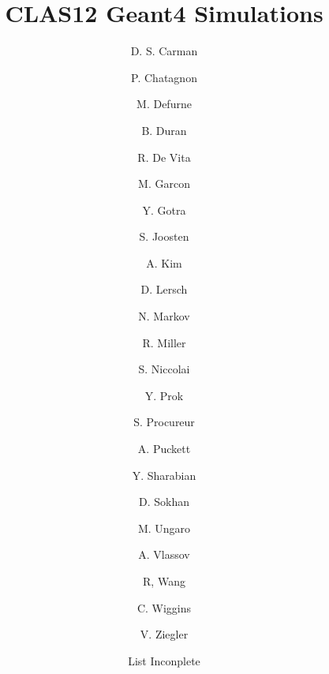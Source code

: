 \title{CLAS12 Geant4 Simulations}




\author[A]{D. S. Carman}
\author[E]{P. Chatagnon}
\author[C]{M. Defurne}
\author[K]{B. Duran}
\author[B]{R. De Vita}
\author[C]{M. Garcon}
\author[A]{Y. Gotra}
\author[K]{S. Joosten}
\author[D]{A. Kim}
\author[J]{D. Lersch}
\author[D]{N. Markov}
\author[A]{R. Miller}
\author[E]{S. Niccolai}
\author[H, I]{Y. Prok}
\author[C]{S. Procureur}
\author[D]{A. Puckett}
\author[A]{Y. Sharabian}
\author[F]{D. Sokhan}
\author[A]{M. Ungaro}
\author[G]{A. Vlassov}
\author[E]{R, Wang}
\author[A]{C. Wiggins}
\author[A]{V. Ziegler}
\author[A]{List Inconplete}

\address[A]{Thomas Jefferson National Accelerator Facility, Newport News, VA, USA}
\address[B]{Istituto Nazionale Di Fisica Nucleare, Genova, Italy}
\address[C]{IRFU, CEA, Universit\`e Paris-Saclay, F-91191 Gif-sur-Yvette, France}
\address[D]{University of Connecticut, Storrs, Connecticut}
\address[E]{Institut de Physique Nuclaire, CNRS-IN2P3, Univ. Paris-Sud, Universit Paris-Saclay, 91406 Orsay Cedex, France}
\address[F]{University of Glasgow, Glasgow G12 8QQ, United Kingdom }
\address[G]{Institute For Theoretical and Experimental Physics, Moscow, Russia}
\address[H]{Old Dominion University, Norfolk, VA, USA}
\address[I]{Virginia Commonwealth University, Richmond, VA, USA}
\address[K]{Temple University, Philadelphia, PA, USA}
